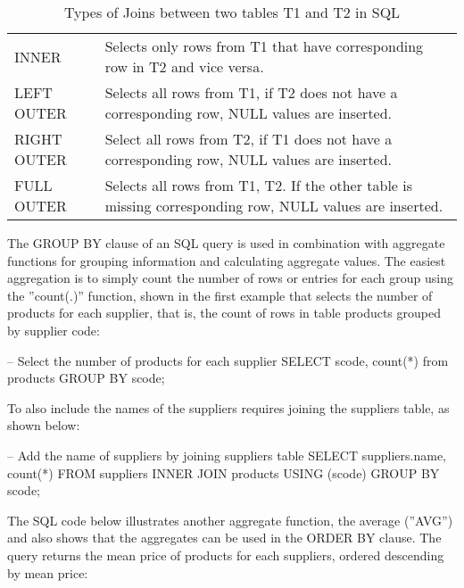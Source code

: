 \begin{table}
\centering

\renewcommand{\arraystretch}{1.5}
\small
\begin{tabularx}{.8\textwidth}{l|X} \hline
INNER & Selects only rows from T1 that have corresponding row in T2 and vice versa. \\
LEFT OUTER & Selects all rows from T1, if T2 does not have a corresponding row, NULL values are inserted. \\
RIGHT OUTER & Select all rows from T2, if T1 does not have a corresponding row, NULL values are inserted. \\
FULL OUTER & Selects all rows from T1, T2. If the other table is missing corresponding row, NULL values are inserted. \\ \hline
\end{tabularx}

\caption{Types of Joins between two tables T1 and T2 in SQL}
\label{tab:sqljoins}
\end{table}

The GROUP BY clause of an SQL query is used in combination with aggregate functions for grouping information and calculating aggregate values. The easiest aggregation is to simply count the number of rows or entries for each group using the ''count(.)'' function, shown in the first example that selects the number of products for each supplier, that is, the count of rows in table products grouped by supplier code:

\begin{samepage}
\begin{sqlcode}
-- Select the number of products for each supplier
SELECT scode, count(*) from products GROUP BY scode;
\end{sqlcode}
\end{samepage}

To also include the names of the suppliers requires joining the suppliers table, as shown below:
\begin{samepage}
\begin{sqlcode}
-- Add the name of suppliers by joining suppliers table
SELECT suppliers.name, count(*)
    FROM suppliers INNER JOIN products USING (scode)
    GROUP BY scode;
\end{sqlcode}
\end{samepage}

The SQL code below illustrates another aggregate function, the average (''AVG'') and also shows that the aggregates can be used in the ORDER BY clause. The query returns the mean price of products for each suppliers, ordered descending by mean price:

